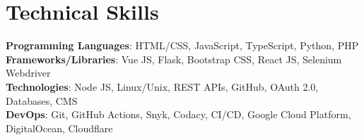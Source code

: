 \section{Technical Skills}
 \begin{itemize}[leftmargin=0.15in, label={}]
    \small{\item{
     \textbf{Programming Languages}{: HTML/CSS, JavaScript, TypeScript, Python, PHP} \\
     \textbf{Frameworks/Libraries}{: Vue JS, Flask, Bootstrap CSS, React JS, Selenium Webdriver} \\
     \textbf{Technologies}{: Node JS, Linux/Unix, REST APIs, GitHub, OAuth 2.0, Databases, CMS } \\
     \textbf{DevOps}{: Git, GitHub Actions, Snyk, Codacy, CI/CD, Google Cloud Platform, DigitalOcean, Cloudflare }
    }}
 \end{itemize}  